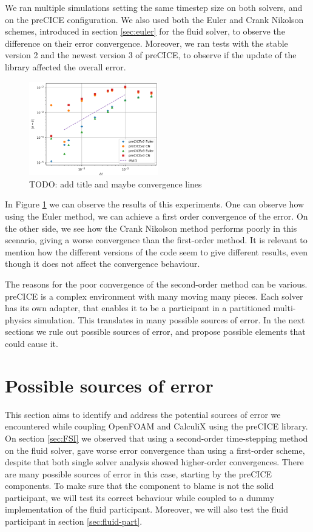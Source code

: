 \documentclass[
  english,        %
  font=times,     %
  onecolumn,      %
]{tumarticle}
\begin{document}
We ran multiple simulations setting the same timestep size on both solvers, and on the preCICE configuration. We also used both the Euler and Crank Nikolson schemes, introduced in section \ref{sec:euler} for the fluid solver, to observe the difference on their error convergence. Moreover, we ran tests with the stable version 2 and the newest version 3 of preCICE, to observe if the update of the library affected the overall error. 
\begin{figure}[!ht]
    \centering
    \includegraphics[width=0.5\textwidth]{resources/coupled_v2_v3_results.png}
    \caption{TODO: add title and maybe convergence lines}
    \label{fig:coupled_v2_v3}
\end{figure}
In Figure \ref{fig:coupled_v2_v3} we can observe the results of this experiments. One can observe how using the Euler method, we can achieve a first order convergence of the error. On the other side, we see how the Crank Nikolson method performs poorly in this scenario, giving a worse convergence than the first-order method. It is relevant to mention how the different versions of the code seem to give different results, even though it does not affect the convergence behaviour.  

The reasons for the poor convergence of the second-order method can be various. preCICE is a complex environment with many moving many pieces. Each solver has its own adapter, that enables it to be a participant in a partitioned multi-physics simulation. This translates in many possible sources of error. In the next sections we rule out possible sources of error, and propose possible elements that could cause it. 


\section{Possible sources of error}
This section aims to identify and address the potential sources of error we encountered while coupling OpenFOAM and CalculiX using the preCICE library. On section \ref{sec:FSI} we observed that using a second-order time-stepping method on the fluid solver, gave worse error convergence than using a first-order scheme, despite that both single solver analysis showed higher-order convergences. There are many possible sources of error in this case, starting by the preCICE components. To make sure that the component to blame is not the solid participant, we will test its correct behaviour while coupled to a dummy implementation of the fluid participant. Moreover, we will also test the fluid participant in section \ref{sec:fluid-part}.
\end{document}
